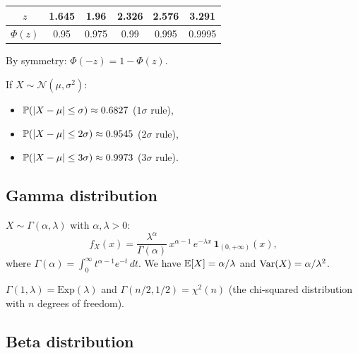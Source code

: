 \begin{keyformulas}[title=\textbf{Key values of $\Phi$}]
\begin{center}
\renewcommand{\arraystretch}{1.3}
\begin{tabular}{cccccc}
    \toprule
    $z$ & 1.645 & 1.96 & 2.326 & 2.576 & 3.291 \\
    \midrule
    $\Phi(z)$ & 0.95 & 0.975 & 0.99 & 0.995 & 0.9995 \\
    \bottomrule
\end{tabular}
\end{center}
By symmetry: $\Phi(-z) = 1 - \Phi(z)$.
\end{keyformulas}

\begin{proposition}
If $X \sim \mathcal{N}(\mu, \sigma^2)$:
\begin{itemize}
    \item $\mathbb{P}(\left| X - \mu \right| \leq \sigma) \approx 0.6827$ \quad ($1\sigma$ rule),
    \item $\mathbb{P}(\left| X - \mu \right| \leq 2\sigma) \approx 0.9545$ \quad ($2\sigma$ rule),
    \item $\mathbb{P}(\left| X - \mu \right| \leq 3\sigma) \approx 0.9973$ \quad ($3\sigma$ rule).
\end{itemize}
\end{proposition}

\subsection{Gamma distribution}

\begin{definition}[Gamma]
$X \sim \Gamma(\alpha, \lambda)$ with $\alpha, \lambda > 0$:
\[
    f_X(x) = \frac{\lambda^\alpha}{\Gamma(\alpha)}\,x^{\alpha-1}\,e^{-\lambda x}\,
    \mathbf{1}_{(0,+\infty)}(x),
\]
where $\Gamma(\alpha) = \int_0^{\infty} t^{\alpha-1}e^{-t}\,dt$. We have
$\mathbb{E}[X] = \alpha/\lambda$ and $\mathrm{Var}(X) = \alpha/\lambda^2$.
\end{definition}

\begin{remark}
$\Gamma(1, \lambda) = \mathrm{Exp}(\lambda)$ and $\Gamma(n/2, 1/2) = \chi^2(n)$
(the chi-squared distribution with $n$ degrees of freedom).
\end{remark}

\subsection{Beta distribution}

